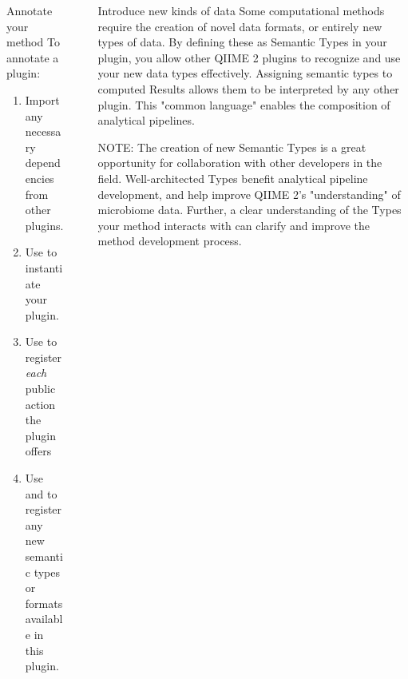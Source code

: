 \documentclass[final]{beamer}
\newlength{\sepwidth}
\newlength{\colwidth}
\newcommand{\separatorcolumn}{\begin{column}{\sepwidth}\end{column}}
\begin{document}
\begin{frame}[t]
\begin{columns}[t]
\begin{column}{\colwidth}
\begin{block}{Annotate your method}
    To annotate a plugin:

    \begin{enumerate}
      \item Import any necessary dependencies from other plugins.
      \item Use  to instantiate your plugin.
      \item Use  to register \textit{each} public action the plugin offers
      \item Use  and  to register any new semantic types or formats available in this plugin.
    \end{enumerate}
  \end{block}

\end{column}

\separatorcolumn

\begin{column}{\colwidth}

\begin{block}{Introduce new kinds of data}
  Some computational methods require the creation of novel data formats, or
  entirely new types of data. By defining these as Semantic Types in your plugin,
  you allow other QIIME 2 plugins to recognize and use your new data types effectively.
  Assigning semantic types to computed Results allows them to be interpreted by
  any other plugin. This "common language" enables the composition of analytical pipelines.

    \begin{tcolorbox}
    [width=\textwidth, colframe=blue]
    {NOTE: The creation of new Semantic Types is a great opportunity for collaboration
    with other developers in the field. Well-architected Types benefit analytical pipeline
    development, and help improve QIIME 2's "understanding" of microbiome data. Further,
    a clear understanding of the Types your method interacts with can clarify and improve the method
    development process.}
    \end{tcolorbox}
  \end{block}


\end{column}
\end{columns}
\end{frame}
\end{document}
